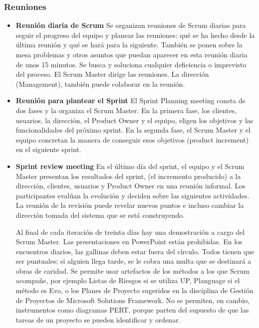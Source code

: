 \subsubsection{Reuniones}
\begin{itemize}
\item \textbf{Reunión diaria de Scrum} Se organizan reuniones de Scrum diarias para seguir el progreso del equipo y planear las reuniones: qué se ha hecho desde la última reunión y qué se hará para la siguiente. También se ponen sobre la mesa problemas y otros asuntos que puedan aparecer en esta reunión diaria de unos 15 minutos. Se busca y soluciona cualquier deficiencia o imprevisto del proceso. El Scrum Master dirige las reuniones. La dirección (Management), también puede colaborar en la reunión.

\item \textbf{Reunión para plantear el Sprint} El Sprint Planning meeting consta de dos fases y la organiza el Scrum Master. En la primera fase, los clientes, usuarios, la dirección, el Product Owner y el equipo, eligen los objetivos y las funcionalidades del próximo sprint. En la segunda fase, el Scrum Master y el equipo concretan la manera de conseguir esos objetivos (product increment) en el siguiente sprint.

\item \textbf{Sprint review meeting} En el último día del sprint, el equipo y el Scrum Master presentan los resultados del sprint, (el incremento producido) a la dirección, clientes, usuarios y Product Owner en una reunión informal. Los participantes evalúan la evolución y deciden sobre las siguientes actividades. La reunión de la revisión puede revelar nuevos puntos e incluso cambiar la dirección tomada del sistema que se está construyendo.

Al final de cada iteración de treinta días hay una demostración a cargo del Scrum Master. Las presentaciones en PowerPoint están prohibidas. En los encuentros diarios, las gallinas deben estar fuera del círculo. Todos tienen que ser puntuales; si alguien llega tarde, se le cobra una multa que se destinará a obras de caridad. Se permite usar artefactos de los métodos a los que Scrum acompañe, por ejemplo Listas de Riesgos si se utiliza UP, Planguage si el método es
Evo, o los Planes de Proyecto sugeridos en la disciplina de Gestión de Proyectos de Microsoft Solutions Framework. No se permiten, en cambio, instrumentos como diagramas PERT, porque parten del supuesto de que las tareas de un proyecto se pueden identificar y ordenar.
\end{itemize}
